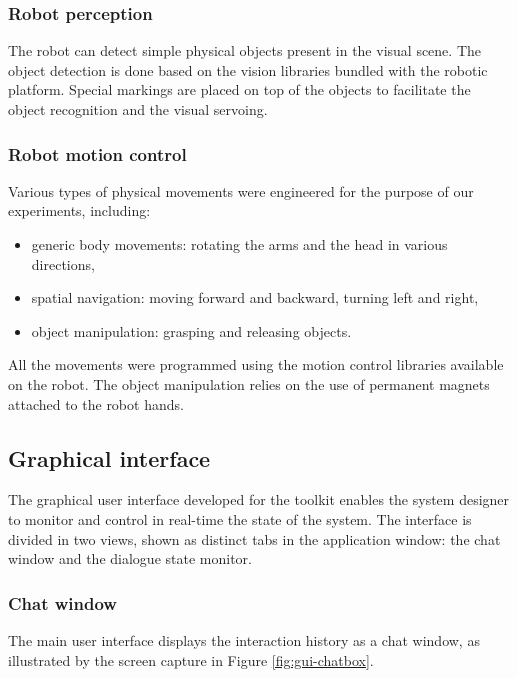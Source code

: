 \subsubsection*{Robot perception}

The robot can detect simple physical objects present in the visual scene. The object detection is done based on the vision libraries bundled with the robotic platform. Special  markings are placed on top of the objects to facilitate the object recognition and the visual servoing.  

\subsubsection*{Robot motion control}

Various types of physical movements were engineered for the purpose of our experiments, including: \begin{itemize}
\item generic body movements: rotating the arms and the head in various directions,
\item spatial navigation: moving forward and backward, turning left and right,
\item object manipulation: grasping and releasing objects.  
\end{itemize}

All the movements were programmed using the motion control libraries available on the robot. The object manipulation relies on the use of permanent magnets attached to the robot hands. 


\subsection{Graphical interface}

The graphical user interface developed for the \opendial{} toolkit enables the system designer to monitor and control in real-time the state of the system.  The interface is divided in two  views, shown as distinct tabs in the application window: the chat window and the dialogue state monitor.

\subsubsection*{Chat window}
The main user interface displays the interaction history as a chat window, as illustrated by the screen capture in Figure \ref{fig:gui-chatbox}.


